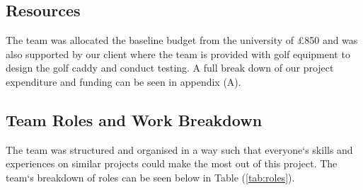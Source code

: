\documentclass[11pt,landscape]{article}
\begin{document}
\begin{multicols}{2}
\subsection{Resources}
The team was allocated the baseline budget from the university of £850 and was
also supported by our client where the team is provided with golf equipment to
design the golf caddy and conduct testing. A full break down of our project
expenditure and funding can be seen in appendix (A). 

\subsection{Team Roles and Work Breakdown}
The team was structured and organised in a way such that everyone`s skills and
experiences on similar projects could make the most out of this project. The
team`s breakdown of roles can be seen below in Table (\ref{tab:roles}). 

\begin{table}[H]
    \begin{center}
        \label{tab:roles}
    \end{center}
\end{table}


\end{multicols}
\end{document}
